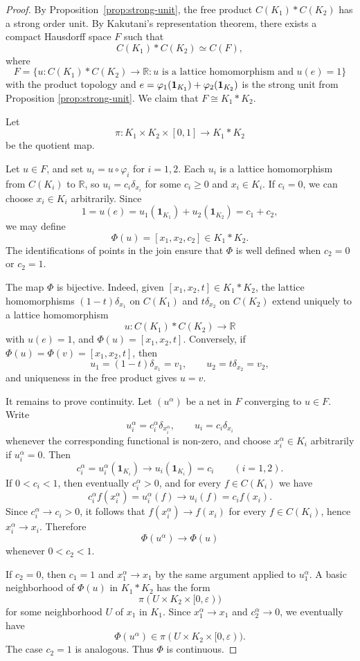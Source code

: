 \documentclass[10pt,a4paper]{amsart}
\newcommand{\one}{\mathbf{1}}
\begin{document}
\begin{proof}
By Proposition~\ref{prop:strong-unit}, the free product $C(K_1)\ast C(K_2)$ has a strong order unit. By Kakutani's representation theorem, there exists a compact Hausdorff space $F$ such that
\[
C(K_1)\ast C(K_2)\simeq C(F),
\]
where \[
F=\{u:C(K_1)*C(K_2)\to\mathbb R:u\text{ is a lattice homomorphism and } u(e)=1\}
\]
with the product topology and $e=\varphi_1(\bold 1_{K_1})+\varphi_2(\bold 1_{K_2})$ is the strong unit from Proposition \ref{prop:strong-unit}. We claim that $F\cong K_1*K_2$.

Let
\[
\pi:K_1\times K_2\times [0,1]\to K_1\ast K_2
\]
be the quotient map. 

Let $u\in F$, and set $u_i=u\circ \varphi_i$ for $i=1,2$. Each $u_i$ is a lattice homomorphism from $C(K_i)$ to $\mathbb{R}$, so $u_i=c_i\delta_{x_i}$ for some $c_i\geq 0$ and $x_i\in K_i$. If $c_i=0$, we can choose $x_i\in K_i$ arbitrarily. Since
\[
1=u(e)=u_1(\one_{K_1})+u_2(\one_{K_2})=c_1+c_2,
\]
we may define
\[
\Phi(u)=[x_1,x_2,c_2]\in K_1\ast K_2.
\]
The identifications of points in the join ensure that $\Phi$ is well defined when $c_2=0$ or $c_2=1$.

The map $\Phi$ is bijective. Indeed, given $[x_1,x_2,t]\in K_1\ast K_2$, the lattice homomorphisms $(1-t)\delta_{x_1}$ on $C(K_1)$ and $t\delta_{x_2}$ on $C(K_2)$ extend uniquely to a lattice homomorphism
\[
u:C(K_1)\ast C(K_2)\to \mathbb{R}
\]
with $u(e)=1$, and $\Phi(u)=[x_1,x_2,t]$. Conversely, if $\Phi(u)=\Phi(v)=[x_1,x_2,t]$, then
\[
u_1=(1-t)\delta_{x_1}=v_1,
\qquad
u_2=t\delta_{x_2}=v_2,
\]
and uniqueness in the free product gives $u=v$.

It remains to prove continuity. Let $(u^\alpha)$ be a net in $F$ converging to $u\in F$. Write
\[
u_i^\alpha=c_i^\alpha\delta_{x_i^\alpha},
\qquad
u_i=c_i\delta_{x_i}
\]
whenever the corresponding functional is non-zero, and choose $x_i^\alpha\in K_i$ arbitrarily if $u_i^\alpha=0$. Then
\[
c_i^\alpha=u_i^\alpha(\one_{K_i})\longrightarrow u_i(\one_{K_i})=c_i
\qquad (i=1,2).
\]
If $0<c_i<1$, then eventually $c_i^\alpha>0$, and for every $f\in C(K_i)$ we have
\[
c_i^\alpha f(x_i^\alpha)=u_i^\alpha(f)\longrightarrow u_i(f)=c_i f(x_i).
\]
Since $c_i^\alpha\to c_i>0$, it follows that $f(x_i^\alpha)\to f(x_i)$ for every $f\in C(K_i)$, hence $x_i^\alpha\to x_i$. Therefore
\[
\Phi(u^\alpha)\to \Phi(u)
\]
whenever $0<c_2<1$.

If $c_2=0$, then $c_1=1$ and $x_1^\alpha\to x_1$ by the same argument applied to $u_1^\alpha$. A basic neighborhood of $\Phi(u)$ in $K_1\ast K_2$ has the form
\[
\pi(U\times K_2\times [0,\varepsilon))
\]
for some neighborhood $U$ of $x_1$ in $K_1$. Since $x_1^\alpha\to x_1$ and $c_2^\alpha\to 0$, we eventually have
\[
\Phi(u^\alpha)\in \pi(U\times K_2\times [0,\varepsilon)).
\]
The case $c_2=1$ is analogous. Thus $\Phi$ is continuous.


\end{proof}
\end{document}
